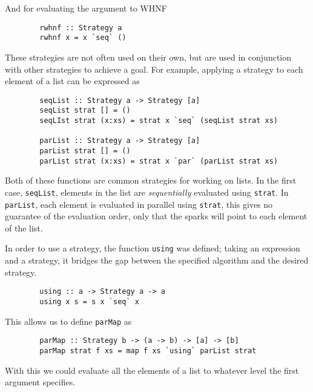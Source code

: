 And for evaluating the argument to WHNF

\begin{verbatim}
        rwhnf :: Strategy a
        rwhnf x = x `seq` ()
\end{verbatim}

These strategies are not often used on their own, but are used in conjunction
with other strategies to achieve a goal. For example, applying a strategy to
each element of a list can be expressed as 

\begin{verbatim}
        seqList :: Strategy a -> Strategy [a]
        seqList strat [] = ()
        seqLIst strat (x:xs) = strat x `seq` (seqList strat xs)

        parList :: Strategy a -> Strategy [a]
        parList strat [] = ()
        parList strat (x:xs) = strat x `par` (parList strat xs)
\end{verbatim}

Both of these functions are common strategies for working on lists. In the first
case, \verb=seqList=, elements in the list are \emph{sequentially} evaluated 
using \verb=strat=. In \verb=parList=, each element is evaluated in parallel
using \verb=strat=, this gives no guarantee of the evaluation order, only that
the sparks will point to each element of the list. 

In order to use a strategy, the function \verb=using= was defined; taking an 
expression and a strategy, it bridges the gap between the specified algorithm
and the desired strategy.

\begin{verbatim}
        using :: a -> Strategy a -> a
        using x s = s x `seq` x
\end{verbatim}

This allows us to define \verb=parMap= as

\begin{verbatim}
        parMap :: Strategy b -> (a -> b) -> [a] -> [b]
        parMap strat f xs = map f xs `using` parList strat
\end{verbatim}

With this we could evaluate all the elements of a list to whatever level the
first argument specifies.
